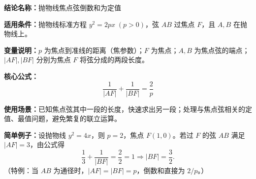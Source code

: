 \textbf{结论名称：}抛物线焦点弦倒数和为定值

\textbf{适用条件：}抛物线标准方程 \(y^{2}=2px\;(p>0)\)，弦 \(AB\) 过焦点 \(F\)，且 \(A,B\) 在抛物线上。

\textbf{变量说明：}\(p\) 为焦点到准线的距离（焦参数）；\(F\) 为焦点；\(A,B\) 为焦点弦的端点；\(|AF|,|BF|\) 分别为焦点 \(F\) 将弦分成的两段长度。

\textbf{核心公式：}
\[
\boxed{\frac{1}{|AF|}+\frac{1}{|BF|}=\frac{2}{p}}
\]

\textbf{使用场景：}已知焦点弦其中一段的长度，快速求出另一段；处理与焦点弦相关的定值、最值问题，避免繁复的联立运算。

\textbf{简单例子：}设抛物线 \(y^{2}=4x\)，则 \(p=2\)，焦点 \(F(1,0)\)。若过 \(F\) 的弦 \(AB\) 满足 \(|AF|=3\)，由公式得
\[
\frac{1}{3}+\frac{1}{|BF|}=\frac{2}{2}=1 \Longrightarrow |BF|=\frac{3}{2}.
\]
（特例：当 \(AB\) 为通径时，\(|AF|=|BF|=p\)，倒数和直接为 \(2/p\)。）